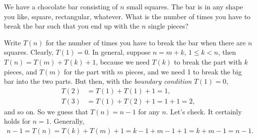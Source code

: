 \begin{exercise}
We have a chocolate bar consisting of $n$ small squares.
The bar is in any shape you like, square, rectangular, whatever.
What is the number of times you have to break the bar such that you end up with the $n$ single pieces?
\begin{solution}
  Write $T(n)$ for the number of times you have to break the bar when there are $n$ squares.
  Clearly, $T(1) =0$.
  In general, suppose $n=m+k$, $1 \leq k < n$, then $T(n) = T(m) + T(k) + 1$, because we need $T(k)$ to break the part with $k$ pieces, and $T(m)$ for the part with $m$ pieces, and we need 1 to break the big bar into the two parts. But then, with the \emph{boundary condition} $T(1)=0$,
  \begin{align*}
    T(2) &= T(1) + T(1) + 1 = 1, \\
T(3) &= T(1) + T(2) + 1 = 1 + 1 = 2,
  \end{align*}
and so on. So we guess that $T(n)=n-1$ for any $n$. Let's check. It certainly holds for $n=1$.  Generally,
\begin{align*}
n-1 = T(n) = T(k) + T(m) + 1 = k-1 + m-1 + 1 = k+m-1 = n-1.
\end{align*}
\end{solution}
\end{exercise}

